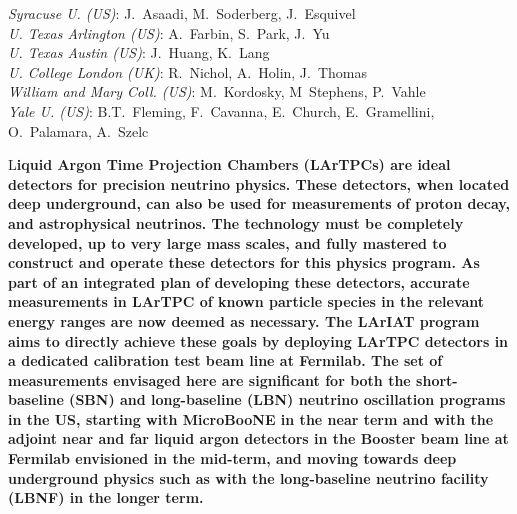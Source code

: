 \documentclass[DIV=calc, paper=a4, fontsize=10pt, twocolumn]{scrartcl}	 %
\newcommand{\initial}[1]{ %
\lettrine[lines=3,lhang=0.3,nindent=0em]{
\color{CadetBlue}
{\textsf{#1}}}{}}
\begin{document}
{  {\color{CadetBlue}\it Syracuse U. (US)}:  J.~Asaadi, M.~Soderberg, J.~Esquivel\\ 
  {\color{CadetBlue}\it U. Texas Arlington (US)}:  A.~Farbin, S.~Park, J.~Yu\\
  {\color{CadetBlue}\it U. Texas Austin (US)}:  J.~Huang, K.~Lang \\  
  {\color{CadetBlue}\it U. College London (UK)}: R.~Nichol, A.~Holin, J.~Thomas \\  
  {\color{CadetBlue}\it William and Mary Coll. (US)}: M.~Kordosky, M~Stephens, P.~Vahle\\         
  {\color{CadetBlue}\it Yale U. (US)}: B.T.~Fleming, F.~Cavanna, E.~Church, E.~Gramellini, O.~Palamara, A.~Szelc\\
}




\initial{L}\textbf{iquid Argon Time Projection Chambers (LArTPCs) are ideal detectors for precision neutrino physics.  These detectors, when located deep underground, can also be used for measurements of proton decay, and astrophysical neutrinos.  The technology must be completely developed, up to very large mass scales, and fully mastered to construct and operate these detectors for this physics program.  As part of an integrated plan of developing these detectors, accurate measurements in LArTPC of known particle species in the relevant energy ranges are now deemed as necessary.  The LArIAT program aims to directly achieve these goals by deploying LArTPC detectors in a dedicated calibration test beam line at Fermilab.  The set of measurements envisaged here are significant for both the short-baseline (SBN) and long-baseline (LBN) neutrino oscillation programs in the US, starting with MicroBooNE in the near term and with the adjoint near and far liquid argon detectors in the Booster beam line at Fermilab envisioned in the mid-term, and moving towards deep underground physics such as with the long-baseline neutrino facility (LBNF) in the longer term. }
\end{document}

